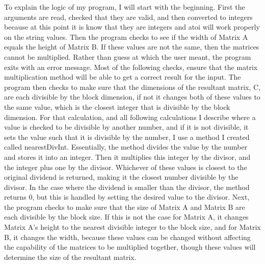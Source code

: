\documentclass[8pt]{article}
\begin{document}
To explain the logic of my program, I will start with the beginning.  First the arguments are read, checked that they are valid, and then converted to integers because at this point it is know that they are integers and atoi will work properly on the string values.  Then the program checks to see if the width of Matrix A equals the height of Matrix B.  If these values are not the same, then the matrices cannot be multiplied.  Rather than guess at which the user meant, the program exits with an error message.  Most of the following checks, ensure that the matrix multiplication method will be able to get a correct result for the input.  The program then checks to make sure that the dimensions of the resultant matrix, C, are each divisible by the block dimension, if not it changes both of these values to the same value, which is the closest integer that is divisible by the block dimension.  For that calculation, and all following calculations I describe where a value is checked to be divisible by another number, and if it is not divisible, it sets the value such that it is divisible by the number, I use a method I created called nearestDivInt.  Essentially, the method divides the value by the number and stores it into an integer.  Then it multiplies this integer by the divisor, and the integer plus one by the divisor.  Whichever of these values is closest to the original dividend is returned, making it the closest number divisible by the divisor.  In the case where the dividend is smaller than the divisor, the method returns 0, but this is handled by setting the desired value to the divisor.  Next, the program checks to make sure that the size of Matrix A and Matrix B are each divisible by the block size.  If this is not the case for Matrix A, it changes Matrix A's height to the nearest divisible integer to the block size, and for Matrix B, it changes the width, because these values can be changed without affecting the capability of the matrices to be multiplied together, though these values will determine the size of the resultant matrix.\\
\end{document}
